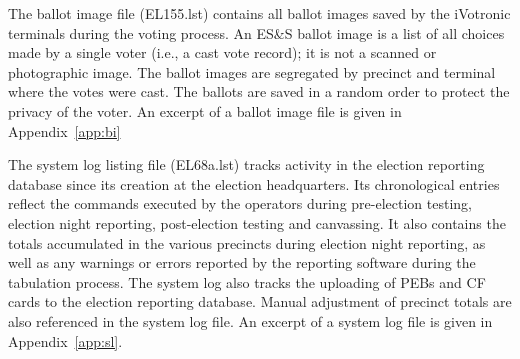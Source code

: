 The ballot image file (EL155.lst) contains all ballot images saved by the iVotronic terminals during the voting process. An ES\&S ballot image is a list of all choices made by a single voter (i.e., a cast vote record); it is not a scanned or photographic image. The ballot images are segregated by precinct and terminal where the votes were cast. The ballots are saved in a random order to protect the privacy of the voter.  An excerpt of a ballot image file is given in  Appendix~\ref{app:bi}
 
The system log listing file (EL68a.lst) tracks activity in the election reporting database since its creation at the election headquarters. Its chronological entries reflect the commands executed by the operators during  pre-election testing, election night reporting, post-election testing and canvassing. It also contains the totals accumulated in the various precincts during election night reporting, as well as any warnings or errors reported by the reporting software during the tabulation process. The system log also tracks the uploading of PEBs and CF cards to the election reporting database. Manual adjustment of precinct totals are also referenced in the system log file. An excerpt of a system log file is given in Appendix~\ref{app:sl}.
